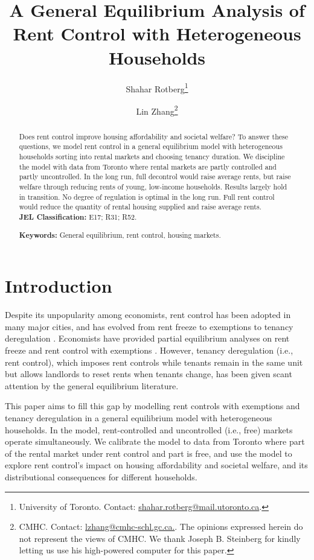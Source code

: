 \documentclass[parskip=full]{article}
\author{
  Shahar Rotberg\footnote{University of Toronto. Contact: \url{shahar.rotberg@mail.utoronto.ca}.} \and Lin Zhang\footnote{CMHC. Contact: \url{lzhang@cmhc-schl.gc.ca.}. The opinions expressed herein do not represent the views of CMHC. We thank Joseph B. Steinberg for kindly letting us use his high-powered computer for this paper.}
}
\title{\vspace{-1.8cm}A General Equilibrium Analysis of Rent Control with Heterogeneous Households}
\begin{document}
\maketitle

\begin{abstract}
\onehalfspacing
\noindent Does rent control improve housing affordability and societal welfare? To answer these questions, we model rent control in a general equilibrium model with heterogeneous households sorting into rental markets and choosing tenancy duration. We discipline the model with data from Toronto where rental markets are partly controlled and partly uncontrolled. In the long run, full decontrol would raise average rents, but raise welfare through reducing rents of young, low-income households. Results largely hold in transition. No degree of regulation is optimal in the long run. Full rent control would reduce the quantity of rental housing supplied and raise average rents.
\\[1.5ex]

\noindent \textbf{JEL Classification:} E17; R31; R52. 

\noindent \textbf{Keywords:} General equilibrium, rent control, housing markets.
\end{abstract}

\section{Introduction}

Despite its unpopularity among economists, rent control has been adopted in many major cities, and has evolved from rent freeze to exemptions to tenancy deregulation \citep{arnott-1995,arnott-2003}. Economists have provided partial equilibrium analyses on rent freeze and rent control with exemptions \citep[among many others]{hayek-1929,fs-1946,fallis-1985}. However, tenancy deregulation (i.e., rent control), which imposes rent controls while tenants remain in the same unit but allows landlords to reset rents when tenants change, has been given scant attention by the general equilibrium literature. 

This paper aims to fill this gap by modelling rent controls with exemptions and tenancy deregulation in a general equilibrium model with heterogeneous households. In the model, rent-controlled and uncontrolled (i.e., free) markets  operate simultaneously. We calibrate the model to data from Toronto where part of the rental market under rent control and part is free, and use the model to explore rent control's impact on housing affordability and societal welfare, and its distributional consequences for different households.
\end{document}

